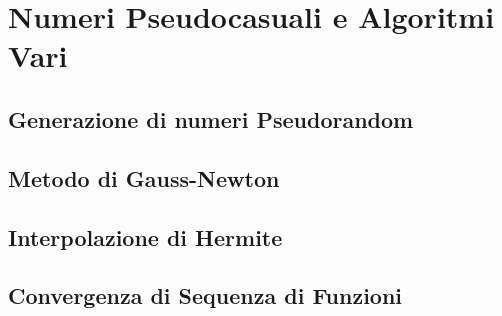 \chapter{Numeri Pseudocasuali e Algoritmi Vari}\label{appendixC}
\section{Generazione di numeri Pseudorandom}\label{appendixC:RNG}
\section{Metodo di Gauss-Newton}\label{appendixC:gaussNewton}
\section{Interpolazione di Hermite}\label{appendixC:hermiteInterp}
\section{Convergenza di Sequenza di Funzioni}\label{appendixC:functionSeqConvergence}

